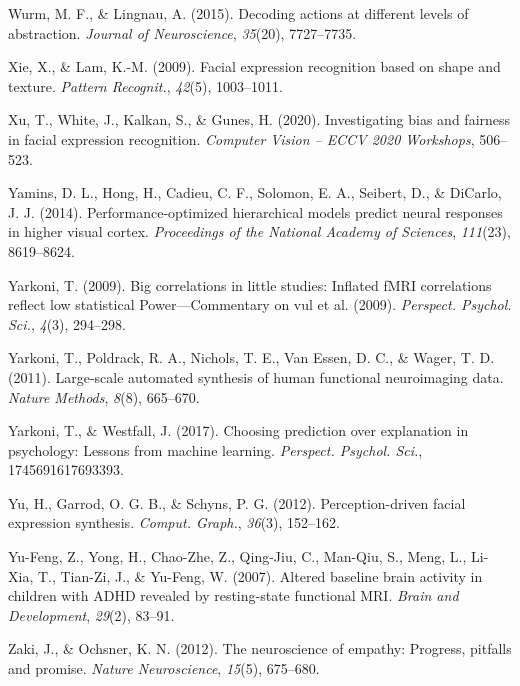 \documentclass[11pt,american,]{memoir} %
\begin{document}
\leavevmode\hypertarget{ref-wurm2015decoding}{}%
Wurm, M. F., \& Lingnau, A. (2015). Decoding actions at different levels of abstraction. \emph{Journal of Neuroscience}, \emph{35}(20), 7727--7735.

\leavevmode\hypertarget{ref-Xie2009-fp}{}%
Xie, X., \& Lam, K.-M. (2009). Facial expression recognition based on shape and texture. \emph{Pattern Recognit.}, \emph{42}(5), 1003--1011.

\leavevmode\hypertarget{ref-Xu2020-jd}{}%
Xu, T., White, J., Kalkan, S., \& Gunes, H. (2020). Investigating bias and fairness in facial expression recognition. \emph{Computer Vision -- ECCV 2020 Workshops}, 506--523.

\leavevmode\hypertarget{ref-yamins2014performance}{}%
Yamins, D. L., Hong, H., Cadieu, C. F., Solomon, E. A., Seibert, D., \& DiCarlo, J. J. (2014). Performance-optimized hierarchical models predict neural responses in higher visual cortex. \emph{Proceedings of the National Academy of Sciences}, \emph{111}(23), 8619--8624.

\leavevmode\hypertarget{ref-Yarkoni2009-pz}{}%
Yarkoni, T. (2009). Big correlations in little studies: Inflated fMRI correlations reflect low statistical Power---Commentary on vul et al. (2009). \emph{Perspect. Psychol. Sci.}, \emph{4}(3), 294--298.

\leavevmode\hypertarget{ref-yarkoni2011large}{}%
Yarkoni, T., Poldrack, R. A., Nichols, T. E., Van Essen, D. C., \& Wager, T. D. (2011). Large-scale automated synthesis of human functional neuroimaging data. \emph{Nature Methods}, \emph{8}(8), 665--670.

\leavevmode\hypertarget{ref-Yarkoni2017-om}{}%
Yarkoni, T., \& Westfall, J. (2017). Choosing prediction over explanation in psychology: Lessons from machine learning. \emph{Perspect. Psychol. Sci.}, 1745691617693393.

\leavevmode\hypertarget{ref-Yu2012-ag}{}%
Yu, H., Garrod, O. G. B., \& Schyns, P. G. (2012). Perception-driven facial expression synthesis. \emph{Comput. Graph.}, \emph{36}(3), 152--162.

\leavevmode\hypertarget{ref-Yu-Feng2007-sg}{}%
Yu-Feng, Z., Yong, H., Chao-Zhe, Z., Qing-Jiu, C., Man-Qiu, S., Meng, L., Li-Xia, T., Tian-Zi, J., \& Yu-Feng, W. (2007). Altered baseline brain activity in children with ADHD revealed by resting-state functional MRI. \emph{Brain and Development}, \emph{29}(2), 83--91.

\leavevmode\hypertarget{ref-zaki2012neuroscience}{}%
Zaki, J., \& Ochsner, K. N. (2012). The neuroscience of empathy: Progress, pitfalls and promise. \emph{Nature Neuroscience}, \emph{15}(5), 675--680.
\end{document}
